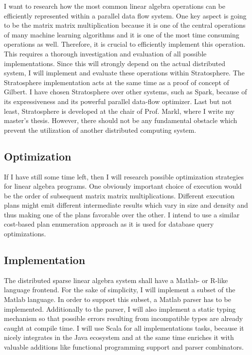 \documentclass{dima}
\begin{document}
I want to research how the most common linear algebra operations can be efficiently represented within a parallel data flow system.
One key aspect is going to be the matrix matrix multiplication because it is one of the central operations of many machine learning algorithms and it is one of the most time consuming operations as well.
Therefore, it is crucial to efficiently implement this operation.
This requires a thorough investigation and evaluation of all possible implementations.
Since this will strongly depend on the actual distributed system, I will implement and evaluate these operations within Stratosphere.
The Stratosphere implementation acts at the same time as a proof of concept of Gilbert.
I have chosen Stratosphere over other systems, such as Spark, because of its expressiveness and its powerful parallel data-flow optimizer.
Last but not least, Stratosphere is developed at the chair of Prof. Markl, where I write my master's thesis.
However, there should not be any fundamental obstacle which prevent the utilization of another distributed computing system.

\subsection{Optimization}

If I have still some time left, then I will research possible optimization strategies for linear algebra programs.
One obviously important choice of execution would be the order of subsequent matrix matrix multiplications.
Different execution plans might emit different intermediate results which vary in size and density and thus making one of the plans favorable over the other.
I intend to use a similar cost-based plan enumeration approach as it is used for database query optimizations.

\subsection{Implementation}

The distributed sparse linear algebra system shall have a Matlab- or R-like language frontend.
For the sake of simplicity, I will implement a subset of the Matlab language.
In order to support this subset, a Matlab parser has to be implemented.
Additionally to the parser, I will also implement a static typing mechanism so that possible errors resulting from incompatible types are already caught at compile time.
I will use Scala for all implementations tasks, because it nicely integrates in the Java ecosystem and at the same time enriches it with valuable additions like functional programming support and parser combinators.
\end{document}
